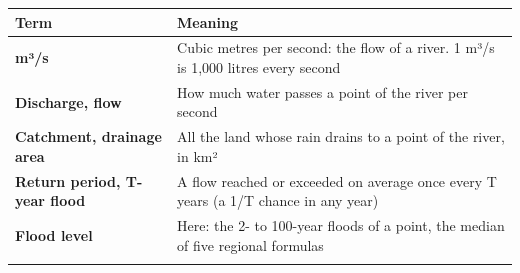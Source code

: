 \documentclass[
  10pt,
]{article}
\begin{document}
\begin{longtable}[]{@{}ll@{}}
\toprule
\begin{minipage}[b]{0.47\columnwidth}\raggedright
Term\strut
\end{minipage} & \begin{minipage}[b]{0.47\columnwidth}\raggedright
Meaning\strut
\end{minipage}\tabularnewline
\midrule
\endhead
\begin{minipage}[t]{0.47\columnwidth}\raggedright
\textbf{m³/s}\strut
\end{minipage} & \begin{minipage}[t]{0.47\columnwidth}\raggedright
Cubic metres per second: the flow of a river. 1 m³/s is 1,000 litres
every second\strut
\end{minipage}\tabularnewline
\begin{minipage}[t]{0.47\columnwidth}\raggedright
\textbf{Discharge, flow}\strut
\end{minipage} & \begin{minipage}[t]{0.47\columnwidth}\raggedright
How much water passes a point of the river per second\strut
\end{minipage}\tabularnewline
\begin{minipage}[t]{0.47\columnwidth}\raggedright
\textbf{Catchment, drainage area}\strut
\end{minipage} & \begin{minipage}[t]{0.47\columnwidth}\raggedright
All the land whose rain drains to a point of the river, in km²\strut
\end{minipage}\tabularnewline
\begin{minipage}[t]{0.47\columnwidth}\raggedright
\textbf{Return period, T-year flood}\strut
\end{minipage} & \begin{minipage}[t]{0.47\columnwidth}\raggedright
A flow reached or exceeded on average once every T years (a 1/T chance
in any year)\strut
\end{minipage}\tabularnewline
\begin{minipage}[t]{0.47\columnwidth}\raggedright
\textbf{Flood level}\strut
\end{minipage} & \begin{minipage}[t]{0.47\columnwidth}\raggedright
Here: the 2- to 100-year floods of a point, the median of five regional
formulas\strut
\end{minipage}\tabularnewline
\begin{minipage}[t]{0.47\columnwidth}\raggedright

\end{minipage}
\end{longtable}
\end{document}
